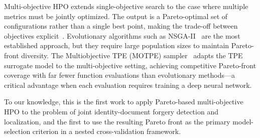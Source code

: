 Multi-objective HPO extends single-objective search to the case where multiple
metrics must be jointly optimized. The output is a Pareto-optimal set of
configurations rather than a single best point, making the trade-off between
objectives explicit~\cite{miettinen1999nonlinear}. Evolutionary algorithms such as
NSGA-II~\cite{nsga2_2002} are the most established approach, but they require
large population sizes to maintain Pareto-front diversity. The Multiobjective TPE
(MOTPE) sampler~\cite{motpe2022} adapts the TPE surrogate model to the
multi-objective setting, achieving competitive Pareto-front coverage with far fewer
function evaluations than evolutionary methods—a critical advantage when each
evaluation requires training a deep neural network.

To our knowledge, this is the first work to apply Pareto-based multi-objective HPO
to the problem of joint identity-document forgery detection and localization, and
the first to use the resulting Pareto front as the primary model-selection criterion
in a nested cross-validation framework.
